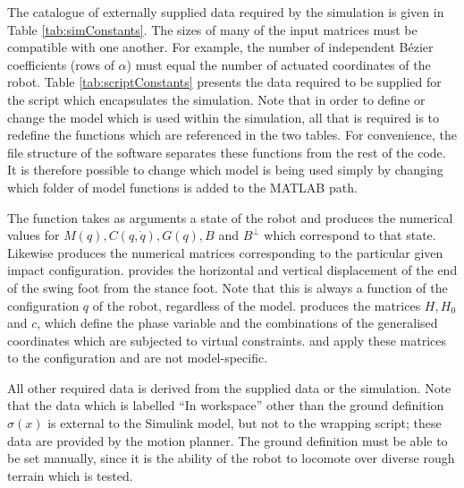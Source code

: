 The catalogue of externally supplied data required by the simulation is given in Table \ref{tab:simConstants}. The sizes of many of the input matrices must be compatible with one another. For example, the number of independent Bézier coefficients (rows of $\alpha$) must equal the number of actuated coordinates of the robot. Table \ref{tab:scriptConstants} presents the data required to be supplied for the script which encapsulates the simulation. Note that in order to define or change the model which is used within the simulation, all that is required is to redefine the functions which are referenced in the two tables. For convenience, the file structure of the software separates these functions from the rest of the code. It is therefore possible to change which model is being used simply by changing which folder of model functions is added to the MATLAB path.

The  function takes as arguments a state of the robot and produces the numerical values for $M(q),C(q,\dot{q}),G(q),B$ and $B^\perp$ which correspond to that state. Likewise  produces the numerical matrices corresponding to the particular given impact configuration.  provides the horizontal and vertical displacement of the end of the swing foot from the stance foot. Note that this is always a function of the configuration $q$ of the robot, regardless of the model.  produces the matrices $H,H_0$ and $c$, which define the phase variable and the combinations of the generalised coordinates which are subjected to virtual constraints.  and  apply these matrices to the configuration and are not model-specific.

All other required data is derived from the supplied data or the simulation. Note that the data which is labelled ``In workspace'' other than the ground definition $\sigma(x)$ is external to the Simulink model, but not to the wrapping script; these data are provided by the motion planner. The ground definition must be able to be set manually, since it is the ability of the robot to locomote over diverse rough terrain which is tested.

